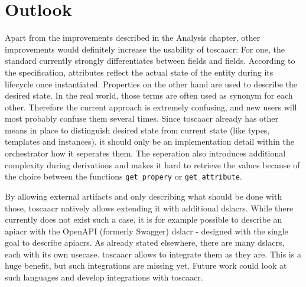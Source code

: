 \chapter{Outlook}




Apart from the  improvements described in the Analysis chapter, other improvements would definitely increase the usability of \gls{toscaacr}: For one, the standard currently strongly differentiates between  fields and  fields. According to the specification, attributes reflect the actual state of the entity during its lifecycle once instantiated. Properties on the other hand are used to describe the desired state. In the real world, those terms are often used as synonym for each other. Therefore the current approach is extremely confusing, and new users will most probably confuse them several times. Since \gls{toscaacr} already has other means in place to distinguish desired state from current state (like types, templates and instances), it should only be an implementation detail within the orchestrator how it seperates them. The seperation also introduces additional complexity during derivations and makes it hard to retrieve the values because of the choice between the functions \texttt{get_propery} or \texttt{get_attribute}.

By allowing external artifacts and only describing what should be done with those, \gls{toscaacr} natively allows extending it with additional \gls{dslacr}s. While there currently does not exist such a case, it is for example possible to describe an \gls{apiacr} with the OpenAPI (formerly Swagger) \gls{dslacr} - designed with the single goal to describe \gls{apiacr}s. As already stated elsewhere, there are many \gls{dslacr}s, each with its own usecase. \Gls{toscaacr} allows to integrate them as they are. This is a huge benefit, but such integrations are missing yet. Future work could look at such languages and develop integrations with \gls{toscaacr}.


